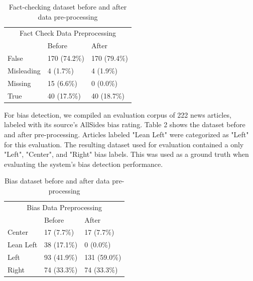 \documentclass[11pt]{article}
\begin{document}
\begin{table}[H]
\begin{center}
\begin{tabular}{llll}
\hline
\multicolumn{4}{c}{Fact Check Data Preprocessing}                     \\
                & \multicolumn{2}{l}{Before}       & After            \\ \hline
False           & \multicolumn{2}{l}{170 (74.2\%)} & 170 (79.4\%)     \\
Misleading& \multicolumn{2}{l}{4 (1.7\%)}    & 4 (1.9\%)        \\
Missing         & \multicolumn{2}{l}{15 (6.6\%)}   & 0 (0.0\%)        \\
True& \multicolumn{2}{l}{40 (17.5\%)}   & 40 (18.7\%)      \\ \hline
\end{tabular}
\caption{Fact-checking dataset before and after data pre-processing}
\end{center}
\label{tab:my_table}
\end{table}



For bias detection, we compiled an evaluation corpus of 222 news articles,  labeled with its source's AllSides bias rating. Table 2 shows the dataset before and after pre-processing. Articles labeled "Lean Left" were categorized as "Left" for this evaluation. The resulting dataset used for evaluation contained a only "Left", "Center", and "Right" bias labels. This was used as a ground truth when evaluating the system's bias detection performance. 
\begin{table}[H]
\begin{center}
\begin{tabular}{lll}
\hline
\multicolumn{3}{c}{Bias Data Preprocessing} \\
            & Before        & After         \\ \hline
Center      & 17 (7.7\%)    & 17 (7.7\%)    \\
Lean Left   & 38 (17.1\%)   & 0 (0.0\%)     \\
Left        & 93 (41.9\%)   & 131 (59.0\%)  \\
Right       & 74 (33.3\%)   & 74 (33.3\%)   \\ \hline
\end{tabular}
\caption{Bias dataset before and after data pre-processing}
\label{tab:my_table}
\end{center}
\end{table}
\end{document}
